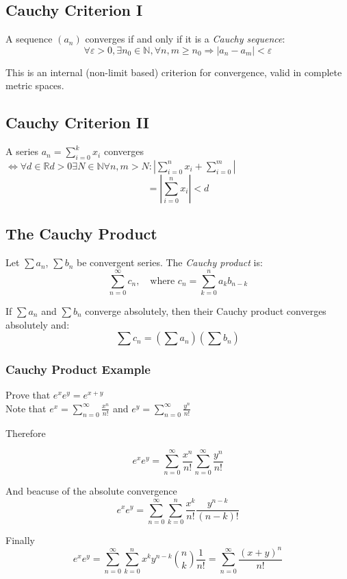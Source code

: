 \subsection{Cauchy Criterion I}

A sequence \((a_n)\) converges if and only if it is a \emph{Cauchy sequence}:
\[
\forall \varepsilon > 0, \exists n_0 \in \mathbb{N}, \forall n, m \ge n_0 \Rightarrow |a_n - a_m| < \varepsilon
\]

This is an internal (non-limit based) criterion for convergence, valid in complete metric spaces.

\subsection{Cauchy Criterion II}
A series \(a_n = \sum_{i = 0}^{k}x_i\) converges \(\iff \forall d \in \mathbb{R} d > 0 
\exists N \in \mathbb{N} \forall n,m > N: \left| \sum_{i = 0}^{n}x_i + \sum_{i=0}^{m}\right|\)
\[= \left|\sum_{i = 0}^{n}x_i\right| < d\]


\subsection{The Cauchy Product}

Let \(\sum a_n\), \(\sum b_n\) be convergent series. The \emph{Cauchy product} is:
\[
\sum_{n=0}^\infty c_n, \quad \text{where } c_n = \sum_{k=0}^n a_k b_{n-k}
\]

If \(\sum a_n\) and \(\sum b_n\) converge absolutely, then their Cauchy product converges absolutely and:
\[
\sum c_n = \left( \sum a_n \right) \left( \sum b_n \right)
\]

\subsubsection{Cauchy Product Example}

Prove that \(e^x  e^y = e^{x + y}\)\\
Note that \(e^x = \sum_{n = 0}^{\infty} \frac{x^n}{n!}\) and \(e^y = \sum_{n = 0}^{\infty} \frac{y^n}{n!}\)

Therefore

\[
  e^x e^y = \sum_{n = 0}^{\infty} \frac{x^n}{n!} \sum_{n = 0}^{\infty} \frac{y^n}{n!}
\]

And beacuse of the absolute convergence
\[
  e^x e^y = \sum_{n = 0}^{\infty}\sum_{k = 0}^{n} \frac{x^k}{n!} \frac{y^{n - k}}{(n-k)!}
\]

Finally
\[
  e^x e^y = \sum_{n = 0}^{\infty}\sum_{k = 0}^{n}x^k y^{n - k} \binom{n}{k} \frac{1}{n!} = \sum_{n = 0}^{\infty} \frac{(x + y)^n}{n!}
\]
\QED
